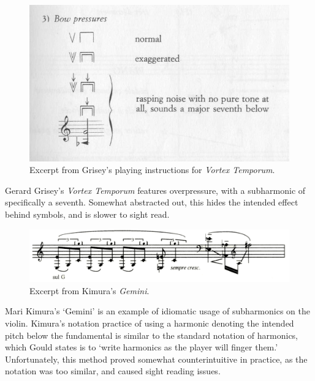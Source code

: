 \begin{figure}
    \includegraphics[width=\linewidth]{./resources/griseyVortexTemporum.jpg}
    \caption{Excerpt from Grisey's playing instructions for \emph{Vortex Temporum}.}
\label{fig:Excerpt from Grisey's playing instructions for Vortex Temporum}
  \end{figure}

Gerard Grisey's \emph{Vortex Temporum} features overpressure, with a subharmonic of specifically a seventh. Somewhat abstracted out, this hides the intended effect behind symbols, and is slower to sight read.

\begin{figure}
    \includegraphics[width=\linewidth]{./resources/kimura_gemini.png}
    \caption{Excerpt from Kimura's \emph{Gemini}.}
\label{fig:Excerpt from Kimura's Gemini}
  \end{figure}

  Mari Kimura's `Gemini' is an example of idiomatic usage of subharmonics on the violin. Kimura's notation practice of using a harmonic denoting the intended pitch below the fundamental is similar to the standard notation of harmonics, which Gould states is to `write harmonics as the player will finger them.'\autocite[413]{gouldBars2011} Unfortunately, this method proved somewhat counterintuitive in practice, as the notation was too similar, and caused sight reading issues.

